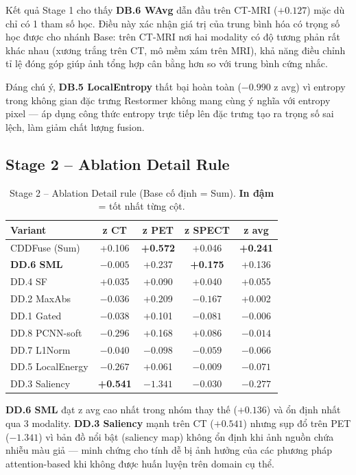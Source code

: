 \documentclass[12pt,a4paper]{article}
\begin{document}
Kết quả Stage 1 cho thấy \textbf{DB.6 WAvg} dẫn đầu trên CT-MRI ($+0.127$) mặc
dù chỉ có 1 tham số học. Điều này xác nhận giá trị của trung bình hóa có trọng số
học được cho nhánh Base: trên CT-MRI nơi hai modality có độ tương phản rất khác
nhau (xương trắng trên CT, mô mềm xám trên MRI), khả năng điều chỉnh tỉ lệ đóng
góp giúp ảnh tổng hợp cân bằng hơn so với trung bình cứng nhắc.

Đáng chú ý, \textbf{DB.5 LocalEntropy} thất bại hoàn toàn ($-0.990$ z avg) vì
entropy trong không gian đặc trưng Restormer không mang cùng ý nghĩa với entropy
pixel --- áp dụng công thức entropy trực tiếp lên đặc trưng tạo ra trọng số sai
lệch, làm giảm chất lượng fusion.

\subsection{Stage 2 -- Ablation Detail Rule}

\begin{table}[h]
\centering
\caption{Stage 2 -- Ablation Detail rule (Base cố định = Sum). \textbf{In đậm}
= tốt nhất từng cột.}
\label{tab:stage2}
\small
\setlength{\tabcolsep}{4pt}
\begin{tabular}{lcccc}
\toprule
\textbf{Variant} & \textbf{z CT} & \textbf{z PET} & \textbf{z SPECT} & \textbf{z avg} \\
\midrule
CDDFuse (Sum)        & +0.106 & \textbf{+0.572} & +0.046 & \textbf{+0.241} \\
\textbf{DD.6 SML}    & $-0.005$ & +0.237 & \textbf{+0.175} & +0.136 \\
DD.4 SF              & +0.035 & +0.090 & +0.040 & +0.055 \\
DD.2 MaxAbs          & $-0.036$ & +0.209 & $-0.167$ & +0.002 \\
DD.1 Gated           & $-0.038$ & +0.101 & $-0.081$ & $-0.006$ \\
DD.8 PCNN-soft       & $-0.296$ & +0.168 & +0.086 & $-0.014$ \\
DD.7 L1Norm          & $-0.040$ & $-0.098$ & $-0.059$ & $-0.066$ \\
DD.5 LocalEnergy     & $-0.267$ & +0.061 & $-0.009$ & $-0.071$ \\
DD.3 Saliency        & \textbf{+0.541} & $-1.341$ & $-0.030$ & $-0.277$ \\
\bottomrule
\end{tabular}
\end{table}

\textbf{DD.6 SML} đạt z avg cao nhất trong nhóm thay thế ($+0.136$) và ổn định
nhất qua 3 modality. \textbf{DD.3 Saliency} mạnh trên CT ($+0.541$) nhưng sụp đổ
trên PET ($-1.341$) vì bản đồ nổi bật (saliency map) không ổn định khi ảnh nguồn
chứa nhiễu màu giả --- minh chứng cho tính dễ bị ảnh hưởng của các phương pháp
attention-based khi không được huấn luyện trên domain cụ thể.
\end{document}
